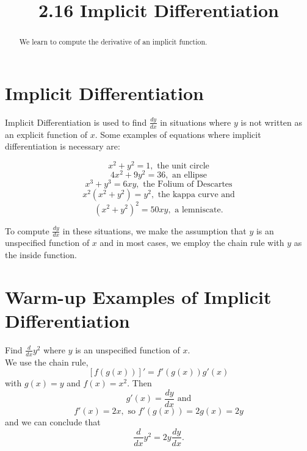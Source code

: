 \documentclass{ximera}
\title{2.16 Implicit Differentiation}
\begin{document}
\begin{abstract}
We learn to compute the derivative of an implicit function.
\end{abstract}

\maketitle

\section{Implicit Differentiation}

Implicit Differentiation is used to find $\frac{dy}{dx}$ in situations where $y$ is not written 
as an explicit function of $x$. 
Some examples of equations where implicit differentiation is necessary are:

\[x^2 + y^2 = 1, \text{ the unit circle} \]
\[4x^2 + 9y^2 = 36, \text{ an ellipse} \]
\[x^3 + y^3 =6xy, \text{ the Folium of Descartes}\]
\[x^2(x^2 + y^2) =y^2,  \text{ the kappa curve and}\]
\[(x^2 + y^2)^2 =50xy, \text{ a lemniscate}.\]

To compute $\frac{dy}{dx}$ in these situations, we make the assumption that $y$ is an unspecified 
function of $x$ and in most cases,
we employ the chain rule  with $y$ as the inside function.

\section{Warm-up Examples of Implicit Differentiation}

\begin{example}[example 1]
Find $\frac{d}{dx} y^2$ where $y$ is an unspecified function of $x$.\\
We use the chain rule,
\[\displaystyle{[f(g(x))]' = f'(g(x))g'(x)}\]
with $g(x) = y$ and $f(x) = x^2$. Then 
\[g'(x) = \frac{dy}{dx} \text{ and}\]
\[f'(x) = 2x, \text{ so } f'(g(x)) = 2g(x) = 2y\]
and we can conclude that
\[\frac{d}{dx} y^2 = 2y \frac{dy}{dx}.\]
\end{example}


\begin{center}
\begin{foldable}
\end{foldable}
\end{center}
\end{document}
